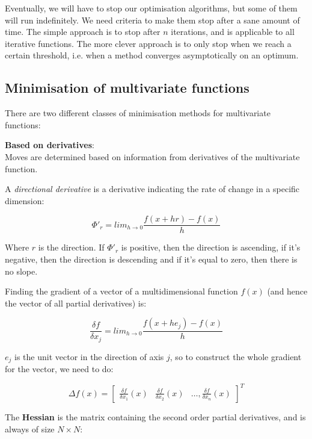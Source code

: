Eventually, we will have to stop our optimisation algorithms, but some of them
will run indefinitely. We need criteria to make them stop after a sane amount of
time. The simple approach is to stop after $n$ iterations, and is applicable to
all iterative functions. The more clever approach is to only stop when we reach
a certain threshold, i.e. when a method converges asymptotically on an optimum.

\subsection{Minimisation of multivariate functions}

There are two different classes of minimisation methods for multivariate
functions:

\begin{description}
  \item \textbf{Based on derivatives}:\\
    Moves are determined based on information from derivatives of the 
    multivariate function.

    A \textit{directional derivative} is a derivative indicating the rate of
    change in a specific dimension:


    \[
      \Phi'_r = lim_{h \rightarrow 0}\frac{f(x + hr) - f(x)}{h}
    \]

    Where $r$ is the direction. If $\Phi'_r$ is positive, then the direction is
    ascending, if it's negative, then the direction is descending and if it's
    equal to zero, then there is no slope.

    Finding the gradient of a vector of a multidimensional function $f(x)$ (and
    hence the vector of all partial derivatives) is:

    \[
      \frac{\delta f}{\delta x_j} =
        lim_{h \rightarrow 0} \frac{f(x + he_j) - f(x)}{h}
    \]

    $e_j$ is the unit vector in the direction of axis $j$, so to construct the 
    whole gradient for the vector, we need to do:

    \[
      \Delta f(x) = \begin{bmatrix}
        \frac{\delta f}{\delta x_1}(x) & \frac{\delta f}{\delta x_2}(x) & \dots,
        \frac{\delta f}{\delta x_n}(x)
      \end{bmatrix}^{T}
    \]

    The \textbf{Hessian} is the matrix containing the second order partial
    derivatives, and is always of size $N \times N$:


\end{description}
